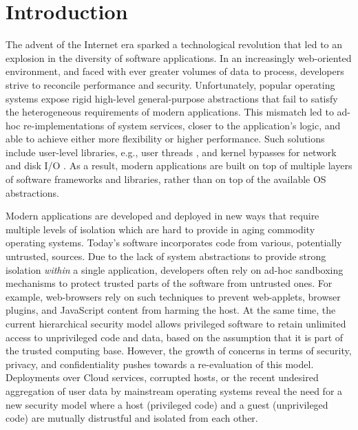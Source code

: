 \section{Introduction}

The advent of the Internet era sparked a technological revolution that led to an explosion in the diversity of software applications.
In an increasingly web-oriented environment, and faced with ever greater volumes of data to process, developers strive to reconcile performance and security.
Unfortunately, popular operating systems expose rigid high-level general-purpose abstractions that fail to satisfy the heterogeneous requirements of modern applications.
This mismatch led to ad-hoc re-implementations of system services, closer to the application's logic, and able to achieve either more flexibility or higher performance.
Such solutions include user-level libraries, e.g., user threads \cite{golang}, and kernel bypasses for network and disk I/O \cite{DBLP:conf/nsdi/NanavatiWW17,intel2014data,intel2016storage,BelayPKGKB14}.
As a result, modern applications are built on top of multiple layers of software frameworks and libraries, rather than on top of the available OS abstractions.

Modern applications are developed and deployed in new ways that require multiple levels of isolation which are hard to provide in aging commodity operating systems.
Today's software incorporates code from various, potentially untrusted, sources.
Due to the lack of system abstractions to provide strong isolation \emph{within} a single application, developers often rely on ad-hoc sandboxing mechanisms to protect trusted parts of the software from untrusted ones.
For example, web-browsers rely on such techniques to prevent web-applets, browser plugins, and JavaScript content from harming the host.
At the same time, the current hierarchical security model allows privileged software to retain unlimited access to unprivileged code and data, based on the assumption that it is part of the trusted computing base.
However, the growth of concerns in terms of security, privacy, and confidentiality pushes towards a re-evaluation of this model.
Deployments over Cloud services, corrupted hosts, or the recent undesired aggregation of user data by mainstream operating systems \cite{microsoftspy} reveal the need for a new security model where a host (privileged code) and a guest (unprivileged code) are mutually distrustful and isolated from each other.

